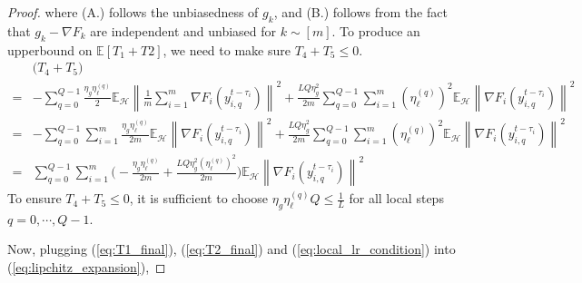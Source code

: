 \documentclass[twoside]{article}
\newcommand{\norm}[1]{\left\lVert#1\right\rVert}
\begin{document}
\begin{proof}
where (A.) follows the unbiasedness of $g_k$, and (B.) follows from the fact that $g_k - \nabla F_k$ are independent and unbiased for $k \sim [m]$.
To produce an upperbound on $\mathbb{E}[T_1 + T2]$, we need to make sure $T_4 + T_5 \leq 0$.
\begin{equation}
    \begin{aligned}
        &\big(T_4 + T_5\big) \\ =&  -\sum_{q=0}^{Q-1} \frac{ \eta_g \eta^{(q)}_{\ell}}{2} \mathbb{E}_{\mathcal{H}} \norm{\frac{1}{m}\sum_{i=1}^m \nabla F_i(y^{t-\tau_i}_{i,q})}^2 + \frac{LQ\eta_g^2}{2m}  \sum_{q=0}^{Q-1}  \sum_{i=1}^m (\eta^{(q)}_{\ell})^2 \mathbb{E}_{\mathcal{H}}  \norm{ \nabla F_i(y^{t-\tau_i}_{i,q}) }^2  \\      
        =& -\sum_{q=0}^{Q-1}\sum_{i=1}^m  \frac{\eta_g \eta^{(q)}_{\ell}}{2m} \mathbb{E}_{\mathcal{H}}  \norm{ \nabla F_i(y^{t-\tau_i}_{i,q})}^2 + \frac{LQ\eta_g^2}{2m}  \sum_{q=0}^{Q-1}  \sum_{i=1}^m (\eta^{(q)}_{\ell})^2 \mathbb{E}_{\mathcal{H}}  \norm{ \nabla F_i(y^{t-\tau_i}_{i,q}) }^2  \\
        =& \sum_{q=0}^{Q-1}\sum_{i=1}^m \Big( -\frac{\eta_g \eta^{(q)}_{\ell}}{2m} + \frac{LQ\eta_g^2 (\eta^{(q)}_{\ell})^2}{2m}  \Big) \mathbb{E}_{\mathcal{H}}  \norm{ \nabla F_i(y^{t-\tau_i}_{i,q})}^2 
    \end{aligned}
    \label{eq:local_lr_condition}
\end{equation}
To ensure $T_4 + T_5 \leq 0$, it is sufficient to choose $\eta_g \eta^{(q)}_{\ell} Q \leq \frac{1}{L}$ for all local steps $q=0,\cdots,Q-1$.


Now, plugging (\ref{eq:T1_final}), (\ref{eq:T2_final}) and (\ref{eq:local_lr_condition}) into     (\ref{eq:lipchitz_expansion}),


\end{proof}
\end{document}

